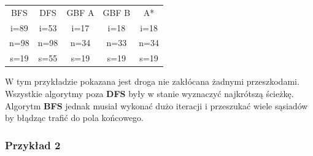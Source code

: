 \documentclass{article}
\begin{document}
\begin{center}
\begin{tabular}{c c c c c}
BFS & DFS & GBF A & GBF B & A* \\
i=89 & i=53 & i=17 & i=18 & i=18 \\
n=98 & n=98 & n=34 & n=33 & n=34 \\ 
s=19 & s=55 & s=19 & s=19 & s=19 \\
\end{tabular}
\end{center}
W tym przykładzie pokazana jest droga nie zakłócana żadnymi przeszkodami. Wszystkie algorytmy poza \textbf{DFS} były w stanie wyznaczyć najkrótszą ścieżkę. Algorytm \textbf{BFS} jednak musiał wykonać dużo iteracji i przeszukać wiele sąsiadów by błądząc trafić do pola końcowego. 

\subsubsection{Przykład 2}
\end{document}
